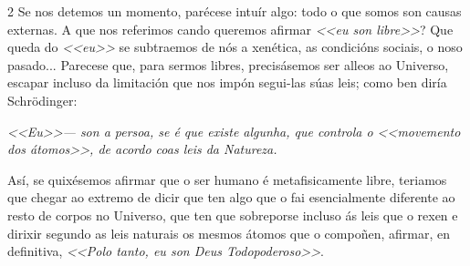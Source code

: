 \begin{multicols}{2}
Se nos detemos un momento, parécese intuír algo: todo o que somos son causas
externas. A que nos referimos cando queremos afirmar \textit{<<eu son libre>>}?
Que queda do \textit{<<eu>>} se subtraemos de nós a xenética, as condicións
sociais, o noso pasado... Parecese que, para sermos libres, precisásemos ser
alleos ao Universo, escapar incluso da limitación que nos impón segui-las súas
leis; como ben diría Schrödinger:~\cite{queeavida}

\textit{<<Eu>>--- son a persoa, se é que existe algunha, que controla o
<<movemento dos átomos>>, de acordo coas leis da Natureza.}

Así, se quixésemos afirmar que o ser humano é metafisicamente libre, teriamos
que chegar ao extremo de dicir que ten algo que o fai esencialmente diferente
ao resto de corpos no Universo, que ten que sobreporse incluso ás leis que o
rexen e dirixir segundo as leis naturais os mesmos átomos que o compoñen,
afirmar, en definitiva, \textit{<<Polo tanto, eu son Deus
Todopoderoso>>}.\cite{queeavida}

\nocite{wikidemolaplace}

\printbibliography

\end{multicols}
